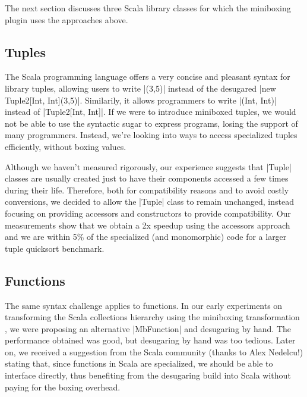 The next section discusses three Scala library classes for which the miniboxing plugin uses the approaches above.

\subsection{Tuples}
\label{sec:tuples}

The Scala programming language offers a very concise and pleasant syntax for library tuples, allowing users to write |(3,5)| instead of the desugared |new Tuple2[Int, Int](3,5)|. Similarily, it allows programmers to write |(Int, Int)| instead of |Tuple2[Int, Int]|. If we were to introduce miniboxed tuples, we would not be able to use the syntactic sugar to express programs, losing the support of many programmers. Instead, we're looking into ways to access specialized tuples efficiently, without boxing values.

Although we haven't measured rigorously, our experience suggests that |Tuple| classes are usually created just to have their components accessed a few times during their life. Therefore, both for compatibility reasons and to avoid costly conversions, we decided to allow the |Tuple| class to remain unchanged, instead focusing on providing accessors and constructors to provide compatibility.
Our measurements show that we obtain a 2x speedup using the accessors approach and we are within 5\% of the specialized (and monomorphic) code for a larger tuple quicksort benchmark.

\subsection{Functions}
\label{sec:functions}

The same syntax challenge applies to functions. In our early experiments on transforming the Scala collections hierarchy using the miniboxing transformation \cite{miniboxing-linkedlist}, we were proposing an alternative |MbFunction| and desugaring by hand. The performance obtained was good, but desugaring by hand was too tedious. Later on, we received a suggestion from the Scala community (thanks to Alex Nedelcu!) stating that, since functions in Scala are specialized, we should be able to interface directly, thus benefiting from the desugaring build into Scala without paying for the boxing overhead.

